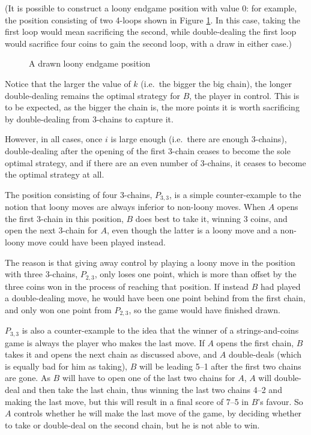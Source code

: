 \documentclass[a4paper,twocolumn]{article}
\begin{document}
(It is possible to construct a loony endgame position with value 0:
for example, the position consisting of two 4-loops shown in Figure
\ref{drawnloony}. In this case, taking the first loop would mean
sacrificing the second, while double-dealing the first loop would
sacrifice four coins to gain the second loop, with a draw in either
case.)

\begin{figure}
  \centering
  \def\svgscale{0.7}
  
  \caption{A drawn loony endgame position}
  \label{drawnloony}
\end{figure}

Notice that the larger the value of $k$ (i.e.\ the bigger the big
chain), the longer double-dealing remains the optimal strategy for
$B$, the player in control. This is to be expected, as the bigger the
chain is, the more points it is worth sacrificing by double-dealing
from 3-chains to capture it.

However, in all cases, once $i$ is large enough (i.e.\ there are enough
3-chains), double-dealing after the opening of the first 3-chain
ceases to become the sole optimal strategy, and if there are an even
number of 3-chains, it ceases to become the optimal strategy at all.

The position consisting of four 3-chains, $P_{3,3}$, is a simple
counter-example to the notion that loony moves are always inferior to
non-loony moves. When $A$ opens the first 3-chain in this position,
$B$ does best to take it, winning 3 coins, and open the next 3-chain
for $A$, even though the latter is a loony move and a non-loony move
could have been played instead.

The reason is that giving away control by playing a loony move in the
position with three 3-chains, $P_{2,3}$, only loses one point, which
is more than offset by the three coins won in the process of reaching
that position. If instead $B$ had played a double-dealing move, he
would have been one point behind from the first chain, and only won
one point from $P_{2,3}$, so the game would have finished drawn.

$P_{3,3}$ is also a counter-example to the idea that the winner of a
strings-and-coins game is always the player who makes the last
move. If $A$ opens the first chain, $B$ takes it and opens the next
chain as discussed above, and $A$ double-deals (which is equally bad
for him as taking), $B$ will be leading 5--1 after the first two
chains are gone. As $B$ will have to open one of the last two chains
for $A$, $A$ will double-deal and then take the last chain, thus
winning the last two chains 4--2 and making the last move, but this
will result in a final score of 7--5 in $B$'s favour. So $A$ controls
whether he will make the last move of the game, by deciding whether to
take or double-deal on the second chain, but he is not able to win.
\end{document}
